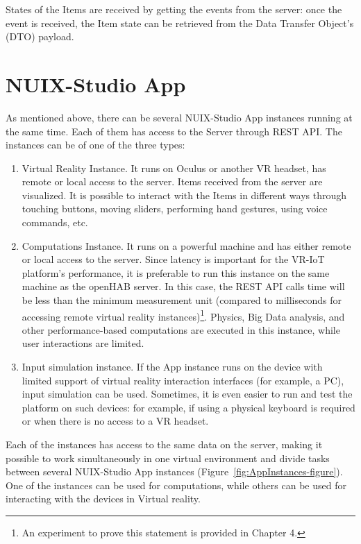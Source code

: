 States of the Items are received by getting the events from the server: once the event is received, the Item state can be retrieved from the Data Transfer Object's (DTO) payload.

\section{NUIX-Studio App}

As mentioned above, there can be several NUIX-Studio App instances running at the same time. Each of them has access to the Server through REST API. The instances can be of one of the three types:

\begin{enumerate}
    \item Virtual Reality Instance. It runs on Oculus or another VR headset, has remote or local access to the server. Items received from the server are visualized. It is possible to interact with the Items in different ways through touching buttons, moving sliders, performing hand gestures, using voice commands, etc. 
    \item Computations Instance. It runs on a powerful machine and has either remote or local access to the server. Since latency is important for the VR-IoT platform's performance, it is preferable to run this instance on the same machine as the openHAB server. In this case, the REST API calls time will be less than the minimum measurement unit (compared to milliseconds for accessing remote virtual reality instances)\footnote{An experiment to prove this statement is provided in Chapter 4.}. Physics, Big Data analysis, and other performance-based computations are executed in this instance, while user interactions are limited.
    \item Input simulation instance. If the App instance runs on the device with limited support of virtual reality interaction interfaces (for example, a PC), input simulation can be used. Sometimes, it is even easier to run and test the platform on such devices: for example, if using a physical keyboard is required or when there is no access to a VR headset.
\end{enumerate}

Each of the instances has access to the same data on the server, making it possible to work simultaneously in one virtual environment and divide tasks between several NUIX-Studio App instances (Figure~\ref{fig:AppInstances-figure}). One of the instances can be used for computations, while others can be used for interacting with the devices in Virtual reality.

